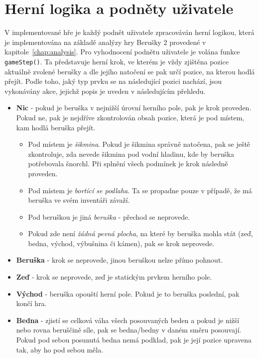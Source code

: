 \section{Herní logika a podněty uživatele}
\label{section:navrhLogika}
V implementované hře je každý podnět uživatele zpracováván herní logikou, která je implementována na základě analýzy hry Berušky 2 provedené v kapitole~\ref{chap:analysis}. Pro vyhodnocení podnětu uživatele je volána funkce \texttt{gameStep()}. Ta představuje herní krok, ve kterém je vždy zjištěna pozice aktuálně zvolené berušky a dle jejího natočení se pak určí pozice, na kterou hodlá přejít. Podle toho, jaký typ prvku se na následující pozici nachází, jsou vykonávány akce, jejichž popis je uveden v následujícím přehledu.

\begin{itemize}
\item \textbf{Nic} - pokud je beruška v nejnižší úrovní herního pole, pak je krok proveden. Pokud ne, pak je nejdříve zkontrolován obsah pozice, která je pod místem, kam hodlá beruška přejít.
\begin{itemize}
\item Pod místem je \textit{šikmina}. Pokud je šikmina správně natočena, pak se ještě zkontroluje, zda nevede šikmina pod vodní hladinu, kde by beruška potřebovala šnorchl. Při splnění všech podmínek je krok následně proveden.
\item Pod místem je \textit{bortící se podlaha}. Ta se propadne pouze v případě, že má beruška ve svém inventáři závaží.
\item Pod beruškou je jiná \textit{beruška} - přechod se neprovede.
\item Pokud zde není \textit{žádná pevná plocha}, na které by beruška mohla stát (zeď, bedna, východ, výbušnina či kámen), pak se krok neprovede. 
\end{itemize}
\item \textbf{Beruška} - krok se neprovede, jinou beruškou nelze přímo pohnout.
\item \textbf{Zeď} - krok se neprovede, zeď je statickým prvkem herního pole.
\item \textbf{Východ} - beruška opouští herní pole. Pokud je to beruška poslední, pak končí hra.
\item \textbf{Bedna} - zjistí se celková váha všech posouvaných beden a pokud je nižší nebo rovna beruščině síle, pak se bedna/bedny v daném směru posouvají. Pokud pod sebou posunutá bedna nemá podklad, pak je její pozice upravena tak, aby ho pod sebou měla.

\end{itemize}
